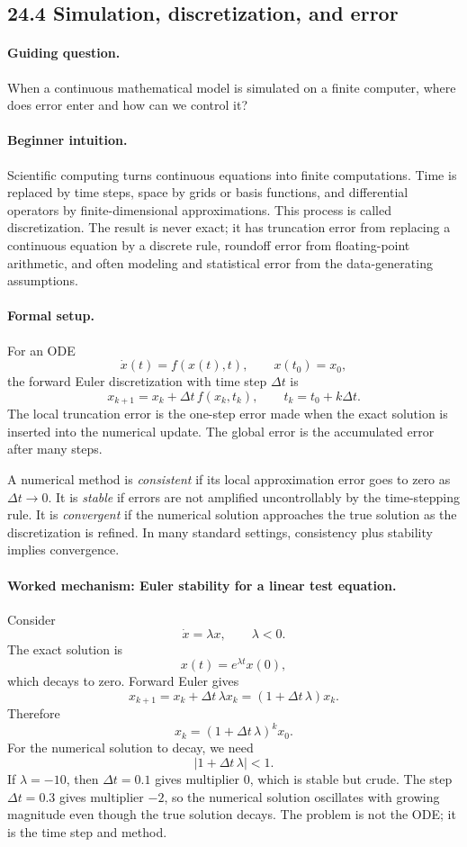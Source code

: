 \subsection{24.4 Simulation, discretization, and error}

\paragraph{Guiding question.}
When a continuous mathematical model is simulated on a finite computer, where does error enter and how can we control it?

\paragraph{Beginner intuition.}
Scientific computing turns continuous equations into finite computations. Time is replaced by time steps, space by grids or basis functions, and differential operators by finite-dimensional approximations. This process is called discretization. The result is never exact; it has truncation error from replacing a continuous equation by a discrete rule, roundoff error from floating-point arithmetic, and often modeling and statistical error from the data-generating assumptions.

\paragraph{Formal setup.}
For an ODE
\[
\dot x(t)=f(x(t),t),\qquad x(t_0)=x_0,
\]
the forward Euler discretization with time step \(\Delta t\) is
\[
x_{k+1}=x_k+\Delta t\, f(x_k,t_k),
\qquad t_k=t_0+k\Delta t.
\]
The local truncation error is the one-step error made when the exact solution is inserted into the numerical update. The global error is the accumulated error after many steps.

A numerical method is \emph{consistent} if its local approximation error goes to zero as \(\Delta t\to 0\). It is \emph{stable} if errors are not amplified uncontrollably by the time-stepping rule. It is \emph{convergent} if the numerical solution approaches the true solution as the discretization is refined. In many standard settings, consistency plus stability implies convergence.

\paragraph{Worked mechanism: Euler stability for a linear test equation.}
Consider
\[
\dot x=\lambda x,\qquad \lambda<0.
\]
The exact solution is
\[
x(t)=e^{\lambda t}x(0),
\]
which decays to zero. Forward Euler gives
\[
x_{k+1}=x_k+\Delta t\,\lambda x_k=(1+\Delta t\,\lambda)x_k.
\]
Therefore
\[
x_k=(1+\Delta t\,\lambda)^k x_0.
\]
For the numerical solution to decay, we need
\[
|1+\Delta t\,\lambda|<1.
\]
If \(\lambda=-10\), then \(\Delta t=0.1\) gives multiplier \(0\), which is stable but crude. The step \(\Delta t=0.3\) gives multiplier \(-2\), so the numerical solution oscillates with growing magnitude even though the true solution decays. The problem is not the ODE; it is the time step and method.

